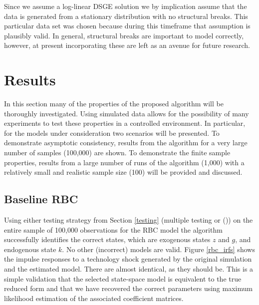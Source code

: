 \documentclass{article}
\begin{document}
Since we assume a log-linear DSGE solution we by implication assume that the data is generated from a stationary distribution with no structural breaks. This particular data set was chosen because during this timeframe that assumption is plausibly valid. In general, structural breaks are important to model correctly, however, at present incorporating these are left as an avenue for future research.

\vspace{-0.01cm}

\section{Results} \label{results}

In this section many of the properties of the proposed algorithm will be thoroughly investigated. Using simulated data allows for the possibility of many experiments to test these properties in a controlled environment. In particular, for the models under consideration two scenarios will be presented. To demonstrate asymptotic consistency, results from the algorithm for a very large number of samples (100,000) are shown. To demonstrate the finite sample properties, results from a large number of runs of the algorithm (1,000) with a relatively small and realistic sample size (100) will be provided and discussed.

\subsection{Baseline RBC}

Using either testing strategy from Section \ref{testing} (multiple testing or \citeauthor{srivastava2005some} (\citeyear{srivastava2005some})) on the entire sample of 100,000 observations for the RBC model the algorithm successfully identifies the correct states, which are exogenous states $z$ and $g$, and endogenous state $k$. No other (incorrect) models are valid. Figure \ref{rbc_irfs} shows the impulse responses to a technology shock generated by the original simulation and the estimated model. There are almost identical, as they should be. This is a simple validation that the selected state-space model is equivalent to the true reduced form and that we have recovered the correct parameters using maximum likelihood estimation of the associated coefficient matrices.
\end{document}
